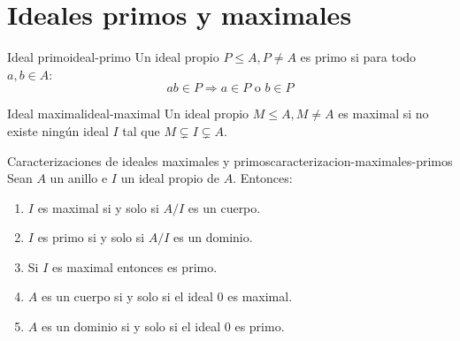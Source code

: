 \clearpage
\section{Ideales primos y maximales}

\begin{definition}{Ideal primo}{ideal-primo}
    Un ideal propio \(P \leq A, P \neq A\) es primo si para todo \(a, b \in A\):
    \[
    ab \in P \Rightarrow a \in P \text{ o } b \in P
    \]
\end{definition}

\begin{definition}{Ideal maximal}{ideal-maximal}
    Un ideal propio \(M \leq A, M \neq A\) es maximal si no existe ningún ideal \(I\) tal que \(M \subsetneq I \subsetneq A\).
\end{definition}

\begin{proposition}{Caracterizaciones de ideales maximales y primos}{caracterizacion-maximales-primos}
Sean \(A\) un anillo e \(I\) un ideal propio de \(A\). Entonces:

\begin{enumerate}
\item \(I\) es maximal si y solo si \(A/I\) es un cuerpo.

\item \(I\) es primo si y solo si \(A/I\) es un dominio.

\item Si \(I\) es maximal entonces es primo.

\item \(A\) es un cuerpo si y solo si el ideal \(0\) es maximal.

\item \(A\) es un dominio si y solo si el ideal \(0\) es primo.
\end{enumerate}

\end{proposition}

